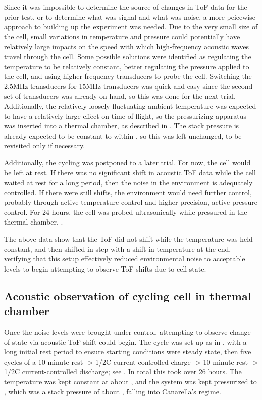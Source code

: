 Since it was impossible to determine the source of changes in ToF data for the prior test, or to determine what was signal and what was noise, a more peicewise approach to building up the experiment was needed. Due to the very small size of the cell, small variations in temperature and pressure could potentially have relatively large impacts on the speed with which high-frequency acoustic waves travel through the cell. Some possible solutions were identified as regulating the temperature to be relatively constant, better regulating the pressure applied to the cell, and using higher frequency transducers to probe the cell. Switching the 2.5MHz transducers for 15MHz transducers was quick and easy since the second set of transducers was already on hand, so this was done for the next trial. Additionally, the relatively loosely fluctuating ambient temperature was expected to have a relatively large effect on time of flight, so the pressurizing apparatus was inserted into a thermal chamber, as described in . The stack pressure is already expected to be constant to within , so this was left unchanged, to be revisited only if necessary.

Additionally, the cycling was postponed to a later trial. For now, the cell would be left at rest. 
If there was no significant shift in acoustic ToF data while the cell waited at rest for a long period, then the noise in the environment is adequately controlled. 
If there were still shifts, the environment would need further control, probably through active temperature control and higher-precision, active pressure control. 
For 24 hours, the cell was probed ultrasonically while pressured in the thermal chamber. .

The above data show that the ToF did not shift while the temperature was held constant, and then shifted in step with a shift in temperature at the end, verifying that this setup effectively reduced environmental noise to acceptable levels to begin attempting to observe ToF shifts due to cell state.

    
\subsection{Acoustic observation of cycling cell in thermal chamber}
Once the noise levels were brought under control, attempting to observe change of state via acoustic ToF shift could begin. The cycle was set up as in , with a long initial rest period to ensure starting conditions were steady state, then five cycles of a 10 minute rest -> 1/2C current-controlled charge -> 10 minute rest -> 1/2C current-controlled discharge; see . In total this took over 26 hours. The temperature was kept constant at about , and the system was kept pressurized to , which was a stack pressure of about , falling into Canarella's  regime.

